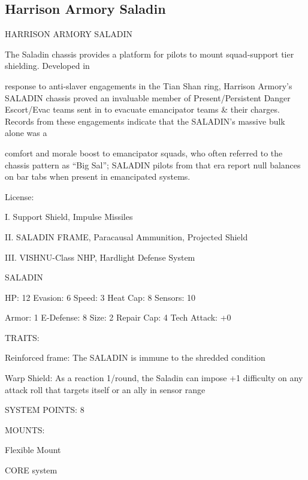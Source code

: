 \subsection{Harrison Armory Saladin}

                                HARRISON ARMORY SALADIN

The Saladin chassis provides a platform for pilots to mount squad-support tier shielding. Developed in

response to anti-slaver engagements in the Tian Shan ring, Harrison Armory’s SALADIN chassis proved an
invaluable member of Present/Persistent Danger Escort/Evac teams sent in to evacuate emancipator teams
\& their charges. Records from these engagements indicate that the SALADIN’s massive bulk alone was a

comfort and morale boost to emancipator squads, who often referred to the chassis pattern as “Big Sal”;
SALADIN pilots from that era report null balances on bar tabs when present in emancipated systems.

                                                   License:

I. Support Shield, Impulse Missiles

II. SALADIN FRAME, Paracausal Ammunition, Projected Shield

III. VISHNU-Class NHP, Hardlight Defense System


                                                 SALADIN

 HP: 12         Evasion: 6                            Speed: 3            Heat Cap: 8        Sensors: 10

 Armor: 1       E-Defense: 8                          Size: 2             Repair Cap: 4      Tech Attack:
                                                                                             +0

                                                   TRAITS:

 Reinforced frame: The SALADIN is immune to the shredded condition

 Warp Shield: As a reaction 1/round, the Saladin can impose +1 difficulty on any attack roll that targets
 itself or an ally in sensor range

                                             SYSTEM POINTS: 8

                                                  MOUNTS:

 Flexible Mount

                                                CORE system




